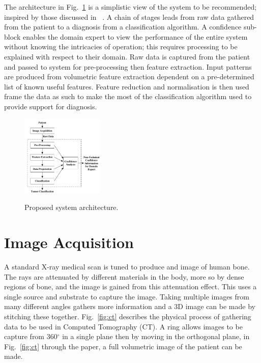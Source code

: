 \documentclass[journal]{IEEEtran}
\begin{document}
The architecture in Fig.~\ref{fig:Proposed} is a simplistic view of the system to be recommended; inspired by those discussed in ~\cite{ahmed2011efficacy,kumar2011classification,sachdeva2011multiclass}.
A chain of stages leads from raw data gathered from the patient to a diagnosis from a classification algorithm.
A confidence sub-block enables the domain expert to view the performance of the entire system without knowing the intricacies of operation; this requires processing to be explained with respect to their domain.
Raw data is captured from the patient and passed to system for pre-processing then feature extraction.
Input patterns are produced from volumetric feature extraction dependent on a pre-determined list of known useful features. 
Feature reduction and normalisation is then used frame the data as such to make the most of the classification algorithm used to provide support for diagnosis.

\begin{figure}[!htb]
   \centering
   \includegraphics[width = 0.35\textwidth]{Figures/Proposed.pdf}
   \label{fig:Proposed}
   \caption{Proposed system architecture.}
\end{figure}











\section{Image Acquisition}
\label{sec:image}

A standard X-ray medical scan is tuned to produce and image of human bone.
The rays are attenuated by different materials in the body, more so by dense regions of bone, and the image is gained from this attenuation effect.  
This uses a single source and substrate to capture the image.
Taking multiple images from many different angles gathers more information and a 3D image can be made by stitching these together.
Fig.~\ref{fig:ct} describes the physical process of gathering data to be used in Computed Tomography (CT).
A ring allows images to be capture from 360$^{\circ}$ in a single plane then by moving in the orthogonal plane, in Fig.~\ref{fig:ct} through the paper, a full volumetric image of the patient can be made. 
\end{document}
